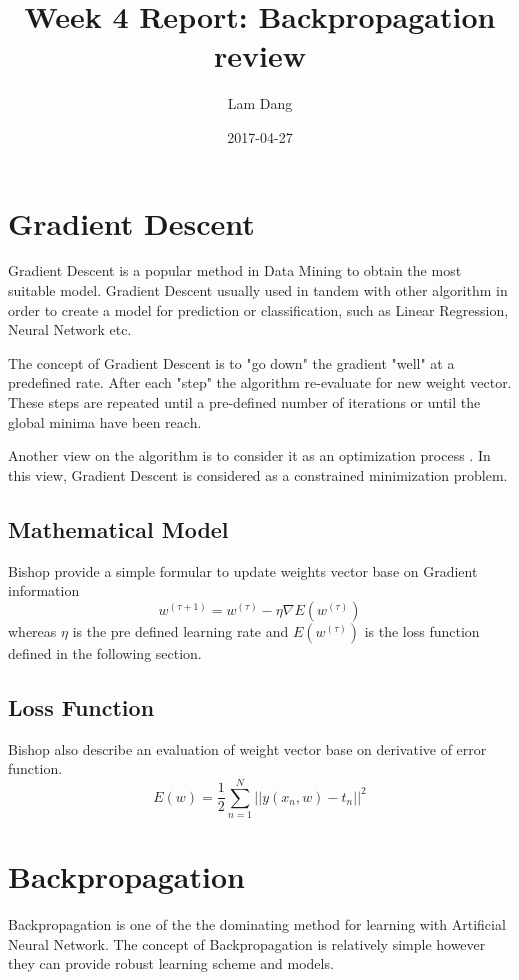 \documentclass{article}
\title{Week 4 Report: Backpropagation review}
\date{2017-04-27}
\author{Lam Dang}
\begin{document}
\maketitle
\newpage
{}
\section{Gradient Descent}
Gradient Descent is a popular method in Data Mining to obtain the most suitable model. Gradient Descent usually used in tandem with other algorithm in order to create a model for prediction or classification, such as Linear Regression, Neural Network etc. \par
The concept of Gradient Descent is to "go down" the gradient "well" at a predefined rate. After each "step" the algorithm re-evaluate for new weight vector. These steps are repeated until a pre-defined number of iterations or until the global minima have been reach.\par
Another view on the algorithm is to consider it as an optimization process \cite{lecun_theoretical_1992}. In this view, Gradient Descent is considered as a constrained minimization problem.
\subsection{Mathematical Model}
Bishop \cite[p240]{bishop_pattern_2006} provide a simple formular to update weights vector base on Gradient information
\begin{equation}
w^{(\tau+1)} = w^{(\tau)} - \eta \nabla E (w^{(\tau)})
\end{equation}
whereas $\eta$ is the pre defined learning rate and $E (w^{(\tau)})$ is the loss function defined in the following section.
\subsection{Loss Function}
Bishop \cite[p242]{bishop_pattern_2006} also describe an evaluation of weight vector base on derivative of error function. 
\begin{equation}
E(w) = \frac{1}{2} \sum_{n=1}^N || y(x_n,w)-t_n||^2
\end{equation}
\pagebreak

\section{Backpropagation}
Backpropagation is one of the the dominating method for learning with Artificial Neural Network. The concept of Backpropagation is relatively simple however they can provide robust learning scheme and models. \cite{lecun_theoretical_1992}
\end{document}
